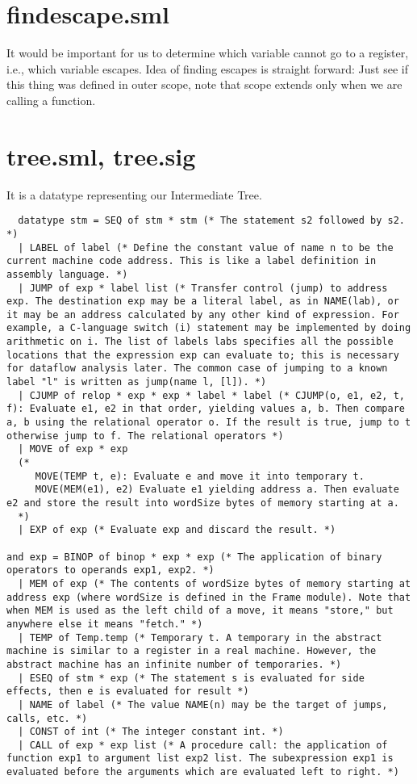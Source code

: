 \section{findescape.sml}

It would be important for us to determine which variable cannot go to a register, i.e., which variable escapes. Idea of finding escapes is straight forward: Just see if this thing was defined in outer scope, note that scope extends only when we are calling a function.

\section{tree.sml, tree.sig}

It is a datatype representing our Intermediate Tree.

\begin{verbatim}
  datatype stm = SEQ of stm * stm (* The statement s2 followed by s2. *)
  | LABEL of label (* Define the constant value of name n to be the current machine code address. This is like a label definition in assembly language. *)
  | JUMP of exp * label list (* Transfer control (jump) to address exp. The destination exp may be a literal label, as in NAME(lab), or it may be an address calculated by any other kind of expression. For example, a C-language switch (i) statement may be implemented by doing arithmetic on i. The list of labels labs specifies all the possible locations that the expression exp can evaluate to; this is necessary for dataflow analysis later. The common case of jumping to a known label "l" is written as jump(name l, [l]). *)
  | CJUMP of relop * exp * exp * label * label (* CJUMP(o, e1, e2, t, f): Evaluate e1, e2 in that order, yielding values a, b. Then compare a, b using the relational operator o. If the result is true, jump to t otherwise jump to f. The relational operators *)
  | MOVE of exp * exp 
  (*
     MOVE(TEMP t, e): Evaluate e and move it into temporary t. 
     MOVE(MEM(e1), e2) Evaluate e1 yielding address a. Then evaluate e2 and store the result into wordSize bytes of memory starting at a.
  *)
  | EXP of exp (* Evaluate exp and discard the result. *)

and exp = BINOP of binop * exp * exp (* The application of binary operators to operands exp1, exp2. *)
  | MEM of exp (* The contents of wordSize bytes of memory starting at address exp (where wordSize is defined in the Frame module). Note that when MEM is used as the left child of a move, it means "store," but anywhere else it means "fetch." *)
  | TEMP of Temp.temp (* Temporary t. A temporary in the abstract machine is similar to a register in a real machine. However, the abstract machine has an infinite number of temporaries. *)
  | ESEQ of stm * exp (* The statement s is evaluated for side effects, then e is evaluated for result *)
  | NAME of label (* The value NAME(n) may be the target of jumps, calls, etc. *)
  | CONST of int (* The integer constant int. *)
  | CALL of exp * exp list (* A procedure call: the application of function exp1 to argument list exp2 list. The subexpression exp1 is evaluated before the arguments which are evaluated left to right. *)


\end{verbatim}
